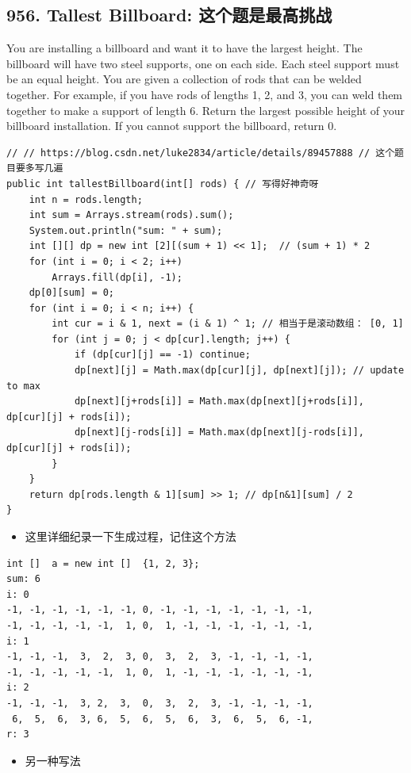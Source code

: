 \documentclass[9pt, b5paper]{article}
\begin{document}
\subsection{956. Tallest Billboard: 这个题是最高挑战}
\label{sec-3-6}
You are installing a billboard and want it to have the largest height. The billboard will have two steel supports, one on each side. Each steel support must be an equal height.
You are given a collection of rods that can be welded together. For example, if you have rods of lengths 1, 2, and 3, you can weld them together to make a support of length 6.
Return the largest possible height of your billboard installation. If you cannot support the billboard, return 0.
\begin{verbatim}
// // https://blog.csdn.net/luke2834/article/details/89457888 // 这个题目要多写几遍
public int tallestBillboard(int[] rods) { // 写得好神奇呀
    int n = rods.length;
    int sum = Arrays.stream(rods).sum();
    System.out.println("sum: " + sum);
    int [][] dp = new int [2][(sum + 1) << 1];  // (sum + 1) * 2
    for (int i = 0; i < 2; i++) 
        Arrays.fill(dp[i], -1);
    dp[0][sum] = 0;
    for (int i = 0; i < n; i++) {
        int cur = i & 1, next = (i & 1) ^ 1; // 相当于是滚动数组： [0, 1]
        for (int j = 0; j < dp[cur].length; j++) {
            if (dp[cur][j] == -1) continue;
            dp[next][j] = Math.max(dp[cur][j], dp[next][j]); // update to max
            dp[next][j+rods[i]] = Math.max(dp[next][j+rods[i]], dp[cur][j] + rods[i]);
            dp[next][j-rods[i]] = Math.max(dp[next][j-rods[i]], dp[cur][j] + rods[i]);
        }
    }
    return dp[rods.length & 1][sum] >> 1; // dp[n&1][sum] / 2
}
\end{verbatim}
\begin{itemize}
\item 这里详细纪录一下生成过程，记住这个方法
\end{itemize}
\begin{verbatim}
int []  a = new int []  {1, 2, 3};
sum: 6
i: 0
-1, -1, -1, -1, -1, -1, 0, -1, -1, -1, -1, -1, -1, -1,
-1, -1, -1, -1, -1,  1, 0,  1, -1, -1, -1, -1, -1, -1,
i: 1
-1, -1, -1,  3,  2,  3, 0,  3,  2,  3, -1, -1, -1, -1,
-1, -1, -1, -1, -1,  1, 0,  1, -1, -1, -1, -1, -1, -1,
i: 2
-1, -1, -1,  3, 2,  3,  0,  3,  2,  3, -1, -1, -1, -1,
 6,  5,  6,  3, 6,  5,  6,  5,  6,  3,  6,  5,  6, -1,
r: 3
\end{verbatim}
\begin{itemize}
\item 另一种写法
\end{itemize}
\end{document}
